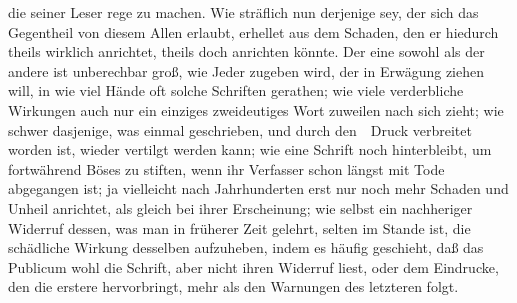 \begin{aufza}
\begin{aufzb}
\item die  seiner Leser rege zu machen. Wie sträflich nun derjenige sey, der sich das Gegentheil von diesem Allen erlaubt, erhellet aus dem Schaden, den er hiedurch theils wirklich anrichtet, theils doch anrichten könnte. Der eine sowohl als der andere ist unberechbar groß, wie Jeder zugeben wird, der in Erwägung ziehen will, in wie viel Hände oft solche Schriften gerathen; wie viele verderbliche Wirkungen auch nur ein einziges zweideutiges Wort zuweilen nach sich zieht; wie schwer dasjenige, was einmal geschrieben, und durch den~\ Druck verbreitet worden ist, wieder vertilgt werden kann; wie eine Schrift noch hinterbleibt, um fortwährend Böses zu stiften, wenn ihr Verfasser schon längst mit Tode abgegangen ist; ja vielleicht nach Jahrhunderten erst nur noch mehr Schaden und Unheil anrichtet, als gleich bei ihrer Erscheinung; wie selbst ein nachheriger Widerruf dessen, was man in früherer Zeit gelehrt, selten im Stande ist, die schädliche Wirkung desselben aufzuheben, indem es häufig geschieht, daß das Publicum wohl die Schrift, aber nicht ihren Widerruf liest, oder dem Eindrucke, den die erstere hervorbringt, mehr als den Warnungen des letzteren folgt.
\end{aufzb}
\end{aufza}


